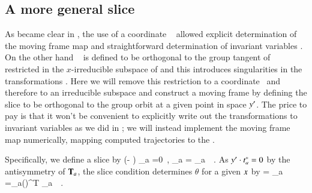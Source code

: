 
\subsection{\label{s:mfReqb}A more general slice}

As became clear in , the use of a coordinate \slice\  
allowed explicit determination of the moving frame map  and straightforward 
determination of invariant variables . 
On the other hand \slice\  is defined to be orthogonal
to the group tangent of  restricted in the $x$-irreducible subspace of  
and this introduces singularities in the transformations .
Here we will remove this restriction to a coordinate \slice\ and therefore to 
an irreducible subspace and construct a moving frame by defining the slice to be orthogonal 
to the group orbit at a given point in space ${y'}$. The price to pay is that it 
won't be convenient to explicitly write out the transformations to invariant variables
as we did in ; we will instead implement the moving frame map numerically,
mapping computed trajectories to the \slice.

Specifically, we define a slice by
\beq
(\sspRed - \slicep ) \cdot \sliceTan_a =0
    \,,\qquad
\sliceTan_a  = \Lg_a \, \slicep
\,.
As ${y'}  \cdot t^*_a =0$ by the antisymmetry of
$\mathbf{T}_a$, the slice condition  determines
$\theta$ for a given $x$ by
 = \sspRed \cdot \Lg_a \, \slicep
	=\ssp \cdot \LieElrep_a(\theta)^T \Lg_a \, \slicep
\,.

